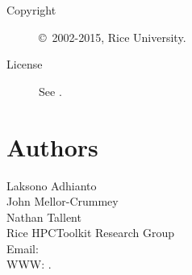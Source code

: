 \documentclass[english]{article}
\begin{document}
\begin{description}
\item[Copyright] \copyright\ 2002-2015, Rice University.
\item[License] See .
\end{description}

\section{Authors}

\noindent
Laksono Adhianto \\
John Mellor-Crummey \\
Nathan Tallent \\
Rice HPCToolkit Research Group \\
Email:  \\
WWW: .

\LatexManEnd
\end{document}
